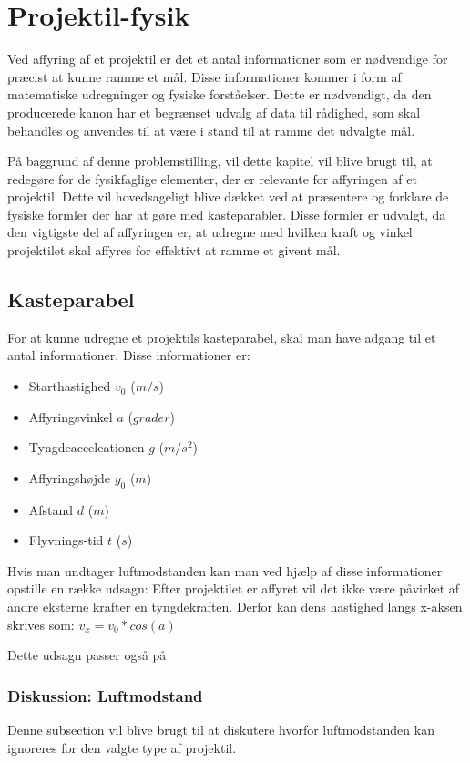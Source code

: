 \chapter{Projektil-fysik}
Ved affyring af et projektil er det et antal informationer som er nødvendige for
præcist at kunne ramme et mål. Disse informationer kommer i form af
matematiske udregninger og fysiske forståelser. Dette er nødvendigt, da den
producerede kanon har et begrænset udvalg af data til rådighed, som skal
behandles og anvendes til at være i stand til at ramme det udvalgte mål.\nl

På baggrund af denne problemstilling, vil dette kapitel vil blive brugt til, at
redegøre for de fysikfaglige elementer, der er relevante for affyringen af et
projektil. Dette vil hovedsageligt blive dækket ved at præsentere og forklare de
fysiske formler der har at gøre med kasteparabler. Disse formler er udvalgt,
da den vigtigste del af affyringen er, at udregne med hvilken kraft og vinkel
projektilet skal affyres for effektivt at ramme et givent mål.\nl

\section{Kasteparabel}
For at kunne udregne et projektils kasteparabel, skal man have adgang til et
antal informationer. Disse informationer er:
\begin{itemize}
  \item Starthastighed $v_0$ ($m/s$)
  \item Affyringsvinkel $a$ ($grader$)
  \item Tyngdeacceleationen $g$ ($m/s^2$)
  \item Affyringshøjde $y_0$ ($m$)
  \item Afstand $d$ ($m$)
  \item Flyvnings-tid $t$ ($s$)
\end{itemize}

Hvis man undtager luftmodstanden kan man ved hjælp af disse informationer
opstille en række udsagn:\nl
Efter projektilet er affyret vil det ikke være påvirket af andre eksterne
krafter en tyngdekraften. Derfor kan dens hastighed langs x-aksen skrives som:
$v_x = v_0 * cos(a)$\nl

Dette udsagn passer også på 

\subsection{Diskussion: Luftmodstand}
Denne subsection vil blive brugt til at diskutere hvorfor luftmodstanden kan
ignoreres for den valgte type af projektil.

